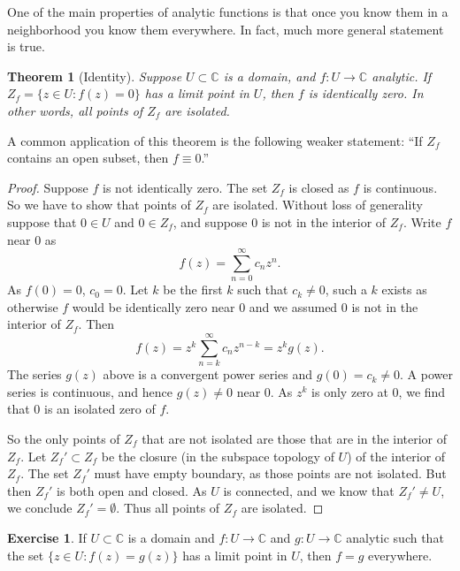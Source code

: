 \documentclass[12pt,openany]{book}
\newcommand{\C}{{\mathbb{C}}}
\theoremstyle{plain}
\newtheorem{thm}{Theorem}[section]
\theoremstyle{remark}
\theoremstyle{definition}
\newenvironment{exbox}{%
    \def\FrameCommand{\vrule width 1pt \relax\hspace {10pt}}%
    \MakeFramed {\advance \hsize -\width \FrameRestore }%
}{%
    \endMakeFramed
}
\theoremstyle{exercise}
\newtheorem{exercise}{Exercise}[section]
\theoremstyle{example}
\begin{document}
One of the main properties of analytic functions is that once you know them
in a neighborhood you know them everywhere.  In fact, much more general
statement is true.

\begin{thm}[Identity]
Suppose $U \subset \C$ is a domain, 
and $f \colon U \to \C$ analytic.  If $Z_f = \{ z \in U : f(z) = 0 \}$
has a limit point in $U$, then $f$ is identically zero.
In other words, all points of $Z_f$ are isolated.
\end{thm}

A common application of this theorem is the following weaker statement: ``If $Z_f$
contains an open subset, then $f \equiv 0$.''

\begin{proof}
Suppose $f$ is not identically zero.
The set $Z_f$ is closed as $f$ is continuous.  So we have to show
that points of $Z_f$ are isolated.
Without loss of generality suppose that $0 \in U$ and $0 \in Z_f$,
and suppose $0$ is not in the interior of $Z_f$.
Write $f$ near $0$ as
\begin{equation*}
f(z) = \sum_{n=0}^\infty c_n z^n .
\end{equation*}
As $f(0) = 0$, $c_0 =0$.  Let $k$ be the first $k$ such that $c_k \not=0$,
such a $k$ exists as otherwise $f$ would be identically zero near $0$
and we assumed $0$ is not in the interior of $Z_f$.  Then
\begin{equation*}
f(z) = z^k \sum_{n=k}^\infty c_n z^{n-k} = z^k g(z) .
\end{equation*}
The series $g(z)$ above is a convergent power series and $g(0) = c_k \not=
0$.  A power series is continuous, and hence $g(z) \not= 0$ near $0$.
As $z^k$ is only zero at $0$, we find that $0$ is an isolated zero of $f$.

So the only points of $Z_f$ that are not isolated are those that are in the
interior of $Z_f$.  Let $Z_f' \subset Z_f$ be the closure (in the subspace
topology of $U$)
of the interior of $Z_f$.
The set $Z_f'$ must have empty boundary, as those points are not isolated.
But then $Z_f'$ is both open and closed.  As $U$ is connected, and we know
that $Z_f' \not= U$, we conclude $Z_f' = \emptyset$.
Thus all points of $Z_f$ are isolated.
\end{proof}

\begin{exbox}
\begin{exercise}
If $U \subset \C$ is a domain and $f \colon U \to \C$ and $g \colon U \to
\C$
analytic such that the set $\{ z \in U : f(z) = g(z) \}$ has a limit
point in $U$, then $f = g$ everywhere.
\end{exercise}
\end{exbox}
\end{document}
